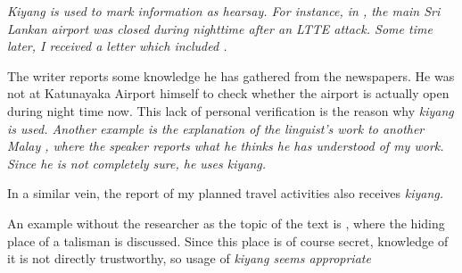 \glossSTDmode

\em Kiyang \em is used to mark information as hearsay. For instance, in , the main Sri Lankan airport was closed during nighttime after an LTTE attack. Some time later, I received a letter which included .


The writer reports some knowledge he has gathered from the newspapers. He was not at Katunayaka Airport himself to check whether the airport is actually open during night time now. This lack of personal verification is the reason why \em kiyang \em is used. Another example is the explanation of the linguist's work to another Malay , where the speaker reports what he thinks he has understood of my work. Since he is not completely sure, he uses \em kiyang\em.


In a similar vein, the report of my planned travel activities also receives \em kiyang\em.


An example without the researcher as the topic of the text is , where the hiding place of a talisman is discussed. Since this place is of course secret, knowledge of it is not directly trustworthy, so usage of \em kiyang \em seems appropriate


